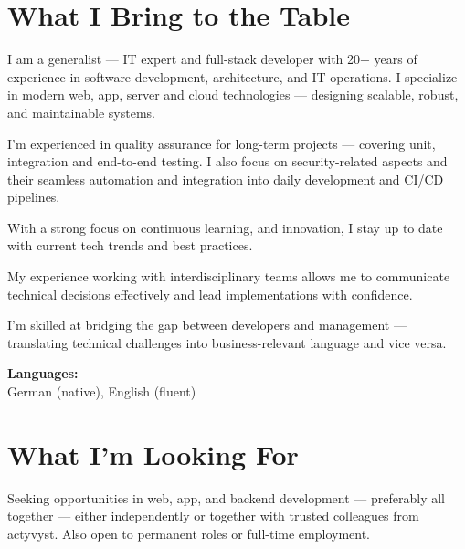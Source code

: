 \documentclass[a4paper,10pt]{article}
\begin{document}
  \begin{minipage}[t]{0.685\textwidth}

    \section*{What I Bring to the Table}

    I am a generalist — IT expert and full-stack developer with 20+ years of 
    experience in software development, architecture, and IT operations.
    I specialize in modern web, app, server and cloud technologies — designing
    scalable, robust, and maintainable systems.

    \vspace{1em}

    I’m experienced in quality assurance for long-term projects — covering unit,
    integration and end-to-end testing. I also focus on security-related aspects
    and their seamless automation and integration into daily development and CI/CD
    pipelines.

    \vspace{1em}

    With a strong focus on continuous learning, and innovation, I stay up to date
    with current tech trends and best practices.

    \vspace{1em}

    My experience working with interdisciplinary teams allows me to communicate
    technical decisions effectively and lead implementations with confidence.

    \vspace{1em}

    I’m skilled at bridging the gap between developers and management — translating
    technical challenges into business-relevant language and vice versa.

    \vspace{1em}

    \vspace{1.5em}
    \textbf{\textcolor{sectionblue}{Languages:}}\\
    German (native), English (fluent)


    \vspace{1.5em}
    \section*{What I'm Looking For}
    Seeking opportunities in web, app, and backend development — preferably 
    all together — either independently or together with trusted colleagues 
    from actyvyst. Also open to permanent roles or full-time employment.
  \end{minipage}
\end{document}
